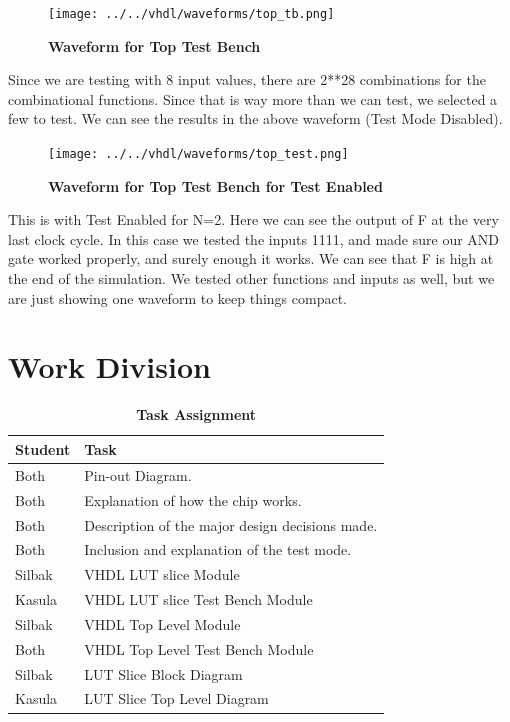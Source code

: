 \documentclass[a4paper]{article}
\begin{document}
    \begin{figure}[H]
        \centering
        \texttt{[image: ../../vhdl/waveforms/top\_tb.png]}
        \caption{\textbf{Waveform for Top Test Bench}}
        \label{fig:gg}
    \end{figure}

    Since we are testing with 8 input values, there are 2**28 combinations for the combinational functions. Since that is
    way more than we can test, we selected a few to test. We can see the results in the above waveform (Test Mode Disabled).

    \begin{figure}[H]
        \centering
        \texttt{[image: ../../vhdl/waveforms/top\_test.png]}
        \caption{\textbf{Waveform for Top Test Bench for Test Enabled}}
        \label{fig:gg}
    \end{figure}

    This is with Test Enabled for N=2. Here we can see the output of F at the very last clock cycle. In this case we
    tested the inputs 1111, and made sure our AND gate worked properly, and surely enough it works. We can see that F
    is high at the end of the simulation. We tested other functions and inputs as well, but we are just showing one waveform
    to keep things compact.

\section{\textbf{Work Division}}
    \begin{table}[H]
        \centering
        \begin{tabular}{l | p{8cm}}
            \hline
            \textbf{Student}   & \textbf{Task} \\ \hline
            \midrule
                Both        & Pin-out Diagram. \\
                Both        & Explanation of how the chip works. \\
                Both        & Description of the major design decisions made. \\
                Both        & Inclusion and explanation of the test mode. \\
                Silbak      & VHDL LUT slice Module \\
                Kasula      & VHDL LUT slice Test Bench Module \\
                Silbak      & VHDL Top Level Module \\
                Both        & VHDL Top Level Test Bench Module \\
                Silbak      & LUT Slice Block Diagram \\
                Kasula      & LUT Slice Top Level Diagram \\
        \end{tabular}
        \caption{\textbf{Task Assignment}}
    \end{table}
\end{document}
